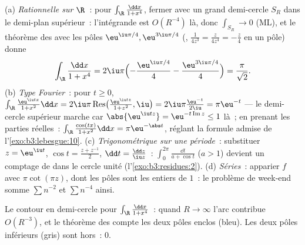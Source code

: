 \begin{example}
\label{ex:b3:residues:integrals}
(a) \emph{Rationnelle sur $\R$}~: pour $\int_\R\frac{\dd x}{1
+ x^4}$, fermer avec un grand demi-cercle $S_R$ dans le
demi-plan supérieur~: l'intégrande est $O(R^{-4})$ là, donc
$\int_{S_R} \to 0$ (ML), et le théorème des  avec les
pôles $\eu^{\iu\pi/4}, \eu^{3\iu\pi/4}$ (, 
$\frac1{4z^3} = \frac{z}{4z^4} = -\frac z4$ en un pôle)
donne
\[
\int_\R\frac{\dd x}{1 + x^4}
= 2\iu\pi\Bigl(-\frac{\eu^{\iu\pi/4}}4 -
\frac{\eu^{3\iu\pi/4}}4\Bigr)
= \frac{\pi}{\sqrt2} .
\]
(b) \emph{Type Fourier}~: pour $t \geq 0$,
$\int_\R\frac{\eu^{\iu tx}}{1 + x^2}\dd x =
2\iu\pi\operatorname{Res}\bigl(\tfrac{\eu^{\iu tz}}{1+z^2},
\iu\bigr) = 2\iu\pi\frac{\eu^{-t}}{2\iu} = \pi\eu^{-t}$ ---
le demi-cercle supérieur marche car $\abs{\eu^{\iu tz}} =
\eu^{-t\operatorname{Im}z} \leq 1$ là~; en prenant les
parties réelles~: $\int_\R\frac{\cos(tx)}{1+x^2}\dd x =
\pi\eu^{-\abs t}$, réglant la formule admise de
l'\cref{exo:b3:lebesgue:10}.
(c) \emph{Trigonométrique sur une période}~: substituer $z =
\eu^{\iu t}$, $\cos t = \frac{z + z^{-1}}2$, $\dd t =
\frac{\dd z}{\iu z}$~: $\int_0^{2\pi}\frac{\dd t}{a + \cos
t}$ ($a > 1$) devient un comptage de  dans le cercle
unité (l'\cref{exo:b3:residues:2}).
(d) \emph{Séries}~: apparier $f$ avec $\pi\cot(\pi z)$, dont
les pôles sont les entiers de  $1$~: le problème de
week-end somme $\sum n^{-2}$ et $\sum n^{-4}$ ainsi.
\end{example}

\begin{omfigure}

{\small Le contour en demi-cercle pour $\int_\R\frac{\dd x}{1
+ x^4}$~: quand $R \to \infty$ l'arc contribue $O(R^{-3})$,
et le théorème des  compte les deux pôles enclos
(bleu). Les deux pôles inférieurs (gris) sont hors~: 
$0$.}
\end{omfigure}

